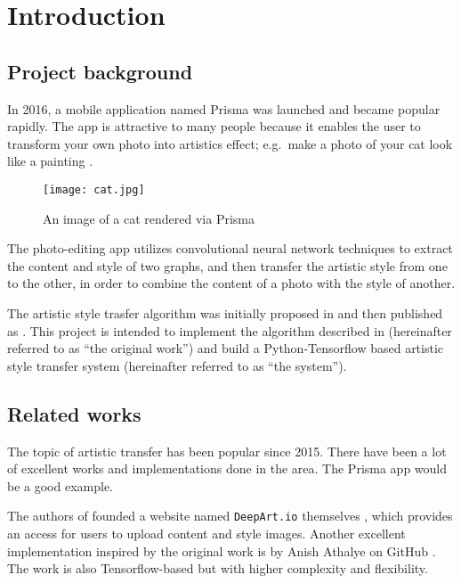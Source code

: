 
\chapter{Introduction}
\label{chap:intro}


\section{Project background}
\label{sec:intro:background}

In 2016, a mobile application named Prisma was launched \cite{wiki:prisma} and became popular rapidly.
The app is attractive to many people because it enables the user to transform your own photo
into artistics effect; e.g.\ make a photo of your cat look like a painting \cite{wiki:prisma}.

    \begin{figure}[!hbt]
    \center
    \texttt{[image: cat.jpg]}
    \caption{An image of a cat rendered via Prisma}
    \label{fig:prisma}
    \end{figure}

The photo-editing app utilizes convolutional neural network techniques to
extract the content and style of two graphs,
and then transfer the artistic style from one to the other,
in order to combine the content of a photo with the style of another.

The artistic style trasfer algorithm was initially proposed in \cite{Gatys:2015ub}
and then published as \cite{Gatys:2016gj}.
This project is intended to implement the algorithm described in \cite{Gatys:2016gj}
(hereinafter referred to as ``the original work'')
and build a Python-Tensorflow based artistic style transfer system
(hereinafter referred to as ``the system'').



\section{Related works}
\label{sec:intro:related}

The topic of artistic transfer has been popular since 2015.
There have been a lot of excellent works and implementations done in the area.
The Prisma app would be a good example.

The authors of \cite{Gatys:2016gj} founded a website named
\texttt{DeepArt.io} themselves \cite{wiki:deepart},
which provides an access for users to upload content and style images.
Another excellent implementation inspired by the original work
is by Anish Athalye on GitHub \cite{athalye2015neuralstyle}.
The work is also Tensorflow-based but with higher complexity and flexibility.

